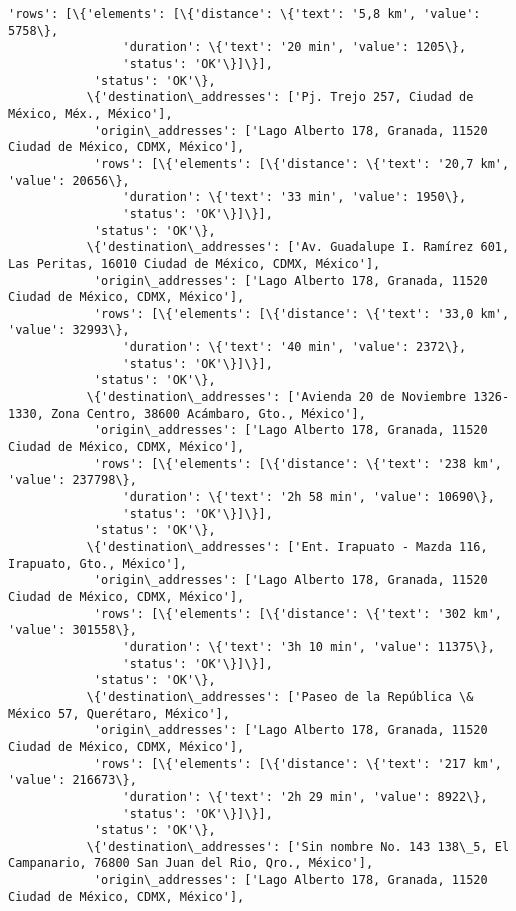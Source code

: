 \documentclass[11pt]{article}
\begin{document}
\begin{Verbatim}[commandchars=\\\{\}]
            'rows': [\{'elements': [\{'distance': \{'text': '5,8 km', 'value': 5758\},
                'duration': \{'text': '20 min', 'value': 1205\},
                'status': 'OK'\}]\}],
            'status': 'OK'\},
           \{'destination\_addresses': ['Pj. Trejo 257, Ciudad de México, Méx., México'],
            'origin\_addresses': ['Lago Alberto 178, Granada, 11520 Ciudad de México, CDMX, México'],
            'rows': [\{'elements': [\{'distance': \{'text': '20,7 km', 'value': 20656\},
                'duration': \{'text': '33 min', 'value': 1950\},
                'status': 'OK'\}]\}],
            'status': 'OK'\},
           \{'destination\_addresses': ['Av. Guadalupe I. Ramírez 601, Las Peritas, 16010 Ciudad de México, CDMX, México'],
            'origin\_addresses': ['Lago Alberto 178, Granada, 11520 Ciudad de México, CDMX, México'],
            'rows': [\{'elements': [\{'distance': \{'text': '33,0 km', 'value': 32993\},
                'duration': \{'text': '40 min', 'value': 2372\},
                'status': 'OK'\}]\}],
            'status': 'OK'\},
           \{'destination\_addresses': ['Avienda 20 de Noviembre 1326-1330, Zona Centro, 38600 Acámbaro, Gto., México'],
            'origin\_addresses': ['Lago Alberto 178, Granada, 11520 Ciudad de México, CDMX, México'],
            'rows': [\{'elements': [\{'distance': \{'text': '238 km', 'value': 237798\},
                'duration': \{'text': '2h 58 min', 'value': 10690\},
                'status': 'OK'\}]\}],
            'status': 'OK'\},
           \{'destination\_addresses': ['Ent. Irapuato - Mazda 116, Irapuato, Gto., México'],
            'origin\_addresses': ['Lago Alberto 178, Granada, 11520 Ciudad de México, CDMX, México'],
            'rows': [\{'elements': [\{'distance': \{'text': '302 km', 'value': 301558\},
                'duration': \{'text': '3h 10 min', 'value': 11375\},
                'status': 'OK'\}]\}],
            'status': 'OK'\},
           \{'destination\_addresses': ['Paseo de la República \& México 57, Querétaro, México'],
            'origin\_addresses': ['Lago Alberto 178, Granada, 11520 Ciudad de México, CDMX, México'],
            'rows': [\{'elements': [\{'distance': \{'text': '217 km', 'value': 216673\},
                'duration': \{'text': '2h 29 min', 'value': 8922\},
                'status': 'OK'\}]\}],
            'status': 'OK'\},
           \{'destination\_addresses': ['Sin nombre No. 143 138\_5, El Campanario, 76800 San Juan del Rio, Qro., México'],
            'origin\_addresses': ['Lago Alberto 178, Granada, 11520 Ciudad de México, CDMX, México'],

\end{Verbatim}
\end{document}
